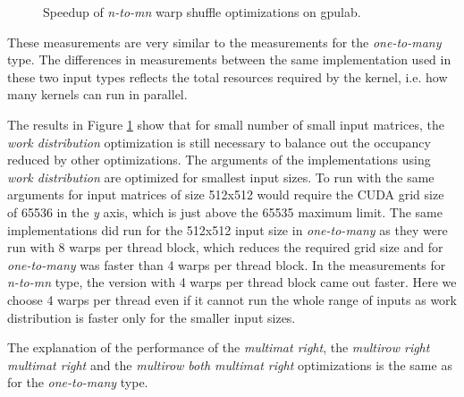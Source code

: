 \begin{figure}[ht]
	\centering	
	\begin{subfigure}{0.49\textwidth}
		\centering
		\def\svgwidth{\textwidth}
		
	\end{subfigure}
	\hfill
	\begin{subfigure}{0.49\textwidth}
		\centering
		\def\svgwidth{\textwidth}
		
	\end{subfigure}
	\hfill
	\begin{subfigure}{0.49\textwidth}
		\centering
		\def\svgwidth{\textwidth}
		
	\end{subfigure}
	
	\caption{Speedup of \textit{n-to-mn} warp shuffle optimizations on gpulab.}
	\label{fig:warp_shuffle_n_to_mn_results}
\end{figure}

These measurements are very similar to the measurements for the \textit{one-to-many} type. The differences in measurements between the same implementation used in these two input types reflects the total resources required by the kernel, i.e. how many kernels can run in parallel.


The results in Figure \ref{fig:warp_shuffle_n_to_mn_results} show that for small number of small input matrices, the \textit{work distribution} optimization is still necessary to balance out the occupancy reduced by other optimizations. The arguments of the implementations using \textit{work distribution} are optimized for smallest input sizes. To run with the same arguments for input matrices of size 512x512 would require the CUDA grid size of 65536 in the \textit{y} axis, which is just above the 65535 maximum limit. The same implementations did run for the 512x512 input size in \textit{one-to-many} as they were run with 8 warps per thread block, which reduces the required grid size and for \textit{one-to-many} was faster than 4 warps per thread block. In the measurements for \textit{n-to-mn} type, the version with 4 warps per thread block came out faster. 
Here we choose 4 warps per thread even if it cannot run the whole range of inputs as work distribution is faster only for the smaller input sizes.

The explanation of the performance of the \textit{multimat right}, the \textit{multirow right multimat right} and the \textit{multirow both multimat right} optimizations is the same as for the \textit{one-to-many} type. %



